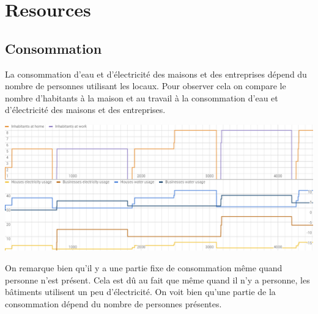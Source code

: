 \documentclass[11pt]{report}
\begin{document}
\section{Resources}
\subsection{Consommation}
La consommation d'eau et d'électricité des maisons et des entreprises dépend du nombre de personnes utilisant les locaux. Pour observer cela on compare le nombre d'habitants à la maison et au travail à la consommation d'eau et d'électricité des maisons et des entreprises.
\begin{center}
	\includegraphics[width=\textwidth]{consumption}
\end{center}
On remarque bien qu'il y a une partie fixe de consommation même quand personne n'est présent. Cela est dû au fait que même quand il n'y a personne, les bâtiments utilisent un peu d'électricité. On voit bien qu'une partie de la consommation dépend du nombre de personnes présentes.
\end{document}
